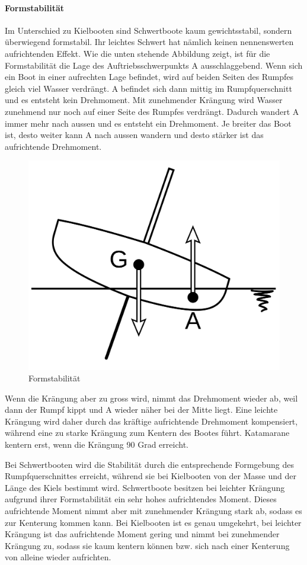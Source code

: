 \paragraph{Formstabilität}
Im Unterschied zu Kielbooten sind Schwertboote kaum gewichtsstabil, sondern überwiegend formstabil. Ihr leichtes Schwert hat nämlich keinen nennenswerten aufrichtenden Effekt. Wie die unten stehende Abbildung zeigt, ist für die Formstabilität die Lage des Auftriebsschwerpunkts A ausschlaggebend. Wenn sich ein Boot in einer aufrechten Lage befindet, wird auf beiden Seiten des Rumpfes gleich viel Wasser verdrängt. A befindet sich dann mittig im Rumpfquerschnitt und es entsteht kein Drehmoment. Mit zunehmender Krängung wird Wasser zunehmend nur noch auf einer Seite des Rumpfes verdrängt. Dadurch wandert A immer mehr nach aussen und es entsteht ein Drehmoment. Je breiter das Boot ist, desto weiter kann A nach aussen wandern und desto stärker ist das aufrichtende Drehmoment. 
\begin{figure}[H]
    \centering
    \includegraphics[width=0.5\linewidth]{Segeln_Formstabilitaet.svg.png}
    \caption{Formstabilität }
    \label{fig:enter-label}
\end{figure}
Wenn die Krängung aber zu gross wird, nimmt das Drehmoment wieder ab, weil dann der Rumpf kippt und A wieder näher bei der Mitte liegt. Eine leichte Krängung wird daher durch das kräftige aufrichtende Drehmoment kompensiert, während eine zu starke Krängung zum Kentern des Bootes führt. Katamarane kentern erst, wenn die Krängung 90 Grad erreicht. 

Bei Schwertbooten wird die Stabilität durch die entsprechende Formgebung des Rumpfquerschnittes erreicht, während sie bei Kielbooten von der Masse und der Länge des Kiels bestimmt wird. Schwertboote besitzen bei leichter Krängung aufgrund ihrer Formstabilität ein sehr hohes aufrichtendes Moment. Dieses aufrichtende Moment nimmt aber mit zunehmender Krängung stark ab, sodass es zur Kenterung kommen kann. Bei Kielbooten ist es genau umgekehrt, bei leichter Krängung ist das aufrichtende Moment gering und nimmt bei zunehmender Krängung zu, sodass sie kaum kentern können bzw. sich nach einer Kenterung von alleine wieder aufrichten. 
\cite{noauthor_schwertboot_2023}
